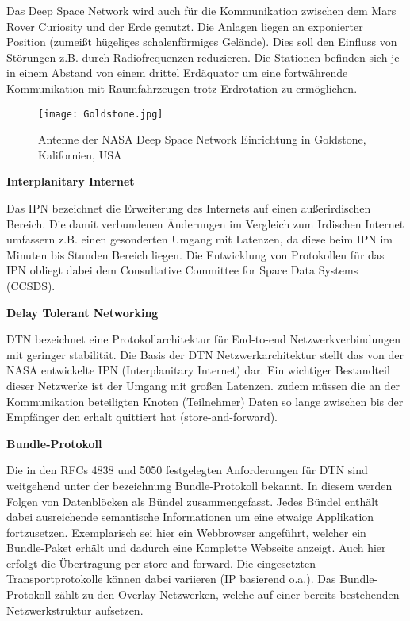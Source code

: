 Das Deep Space Network wird auch f{\"u}r die Kommunikation zwischen dem Mars
Rover Curiosity und der Erde genutzt. Die Anlagen liegen an exponierter Position
(zumei{\ss}t h{\"u}geliges schalenf{\"o}rmiges Gel{\"a}nde). Dies soll den
Einfluss von St{\"o}rungen z.B. durch Radiofrequenzen reduzieren. Die Stationen
befinden sich je in einem Abstand von einem drittel Erd{\"a}quator um eine
fortw{\"a}hrende Kommunikation mit Raumfahrzeugen trotz Erdrotation zu
erm{\"o}glichen.

\begin{figure}[H]
\centering
\texttt{[image: Goldstone.jpg]}
\caption{Antenne der NASA Deep Space Network Einrichtung in Goldstone,
Kalifornien, USA}
\label{fig:Goldstone}
\end{figure}

\textbf{Interplanitary Internet}

Das IPN bezeichnet die Erweiterung des Internets auf einen au{\ss}erirdischen
Bereich. Die damit verbundenen {\"A}nderungen im Vergleich zum Irdischen
Internet umfassern z.B. einen gesonderten Umgang mit Latenzen, da diese beim IPN
im Minuten bis Stunden Bereich liegen. Die Entwicklung von Protokollen
f{\"u}r das IPN obliegt dabei dem Consultative Committee for Space Data Systems
(CCSDS).

\textbf{Delay Tolerant Networking}

DTN bezeichnet eine Protokollarchitektur f{\"u}r End-to-end Netzwerkverbindungen
mit geringer stabilit{\"a}t. Die Basis der DTN Netzwerkarchitektur stellt das
von der NASA entwickelte IPN (Interplanitary Internet) dar. Ein wichtiger
Bestandteil dieser Netzwerke ist der Umgang mit gro{\ss}en Latenzen. zudem
m{\"u}ssen die an der Kommunikation beteiligten Knoten (Teilnehmer) Daten so
lange zwischen bis der Empf{\"a}nger den erhalt quittiert hat
(store-and-forward).

\textbf{Bundle-Protokoll}

Die in den RFCs 4838 und 5050 festgelegten Anforderungen f{\"u}r DTN sind
weitgehend unter der bezeichnung Bundle-Protokoll bekannt. In diesem werden Folgen von
Datenbl{\"o}cken als B{\"u}ndel zusammengefasst. Jedes B{\"u}ndel enth{\"a}lt
dabei ausreichende semantische Informationen um eine etwaige Applikation
fortzusetzen. Exemplarisch sei hier ein Webbrowser angef{\"u}hrt, welcher ein
Bundle-Paket erh{\"a}lt und dadurch eine Komplette Webseite anzeigt. Auch hier
erfolgt die {\"U}bertragung per store-and-forward. Die eingesetzten
Transportprotokolle k{\"o}nnen dabei variieren (IP basierend o.a.). Das
Bundle-Protokoll z{\"a}hlt zu den Overlay-Netzwerken, welche auf einer bereits
bestehenden Netzwerkstruktur aufsetzen.

